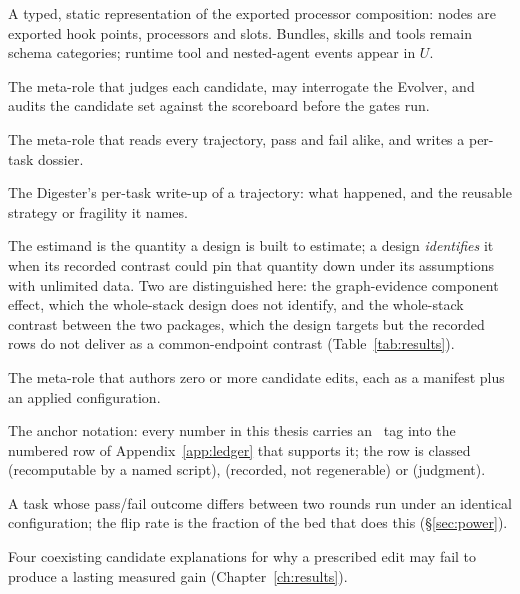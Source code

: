 \begin{description}[leftmargin=1.8em,labelsep=0.4em,itemsep=0.5pt,parsep=0pt,topsep=2pt]
\item[composition graph ($G$)] A typed, static representation of the
exported processor composition: nodes are exported hook points, processors
and slots. Bundles, skills and tools remain schema categories; runtime tool
and nested-agent events appear in $U$.

\item[Critic] The meta-role that judges each candidate, may interrogate
the Evolver, and audits the candidate set against the scoreboard before
the gates run.

\item[Digester] The meta-role that reads every trajectory, pass and fail
alike, and writes a per-task dossier.

\item[dossier] The Digester's per-task write-up of a trajectory: what
happened, and the reusable strategy or fragility it names.

\item[estimand / identified] The estimand is the quantity a design is built
to estimate; a design \emph{identifies} it when its recorded contrast could
pin that quantity down under its assumptions with unlimited data. Two are
distinguished here: the graph-evidence component effect, which the
whole-stack design does not identify, and the whole-stack contrast between
the two packages, which the design targets but the recorded rows do not
deliver as a common-endpoint contrast (Table~\ref{tab:results}).

\item[Evolver] The meta-role that authors zero or more candidate edits,
each as a manifest plus an applied configuration.

\item[\texttt{\textbackslash F\{n\}} / \cls{A}/\cls{B}/\cls{C}] The anchor
notation: every number in this thesis carries an \F{}~tag into the
numbered row of Appendix~\ref{app:ledger} that supports it; the row is
classed  (recomputable by a named script),  (recorded, not
regenerable) or  (judgment).

\item[flip / flip rate] A task whose pass/fail outcome differs between two
rounds run under an identical configuration; the flip rate is the fraction
of the bed that does this (\S\ref{sec:power}).

\item[four layers of mortality] Four coexisting candidate explanations
for why a prescribed edit may fail to produce a lasting measured gain
(Chapter~\ref{ch:results}).


\end{description}
